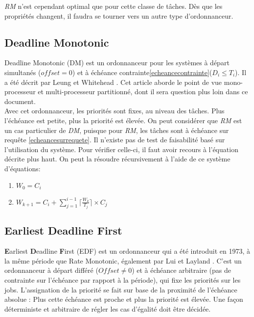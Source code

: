 \documentclass[11pt,a4paper,oneside]{report}
\begin{document}
\textit{RM} n'est cependant optimal que pour cette classe de tâches. Dès que les propriétés changent, 
il faudra se tourner vers un autre type d'ordonnanceur.


\subsection{Deadline Monotonic}
Deadline Monotonic (DM) est un ordonnanceur pour les systèmes à départ simultanés ($offset = 0$) et 
à échéance contrainte\ref{echeancecontrainte}($D_i \leq T_i$). Il a été décrit par Leung et Whitehead 
\cite{leung_complexity_1982}. Cet article aborde le point de vue mono-processeur et multi-processeur partitionné, 
dont il sera question plus loin dans ce document.\\

Avec cet ordonnanceur, les priorités sont fixes, au niveau des tâches.
Plus l'échéance est petite, plus la priorité est élevée. On peut considérer que \textit{RM} est 
un cas particulier de \textit{DM}, puisque pour \textit{RM}, les tâches sont à échéance sur requête \ref{echeancesurrequete}.
Il n'existe pas de test de faisabilité basé sur l'utilisation du système. Pour vérifier celle-ci, 
il faut avoir recours à l'équation décrite plus haut. 
On peut la résoudre récursivement à l'aide de ce système d'équations: \\
\begin{enumerate}
	\item $W_0 = C_i $
	\item $W_{k+1} = C_i + \sum_{j = 1}^{i-1}\lceil \frac{W_k}{T_j} \rceil \times C_j $
\end{enumerate}



\subsection{Earliest Deadline First}
\textbf{E}arliest \textbf{D}eadline \textbf{F}irst (EDF) est un ordonnanceur 
qui a été introduit en 1973, à la même période que Rate Monotonic, également 
par Lui et Layland \cite{liu_scheduling_1973}. C'est un ordonnanceur à départ différé ($Offset \neq 0$) 
et à échéance arbitraire (pas de contrainte sur l'échéance par rapport à la période), 
qui fixe les priorités sur les jobs. L'assignation de la priorité se fait sur base de 
la proximité de l'échéance absolue : Plus cette échéance est proche et plus la priorité est élevée. 
Une façon déterministe et arbitraire de régler les cas d'égalité doit être décidée.\\
\end{document}
